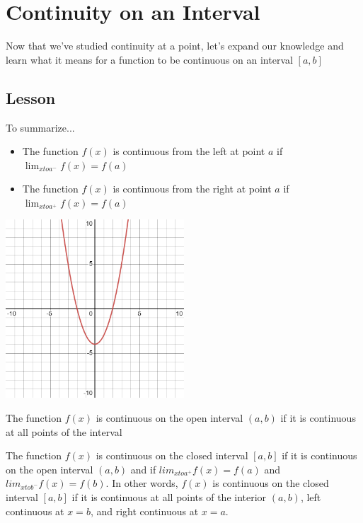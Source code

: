 \documentclass{ximera}
\begin{document}
\section{Continuity on an Interval}

Now that we've studied continuity at a point, let's expand our knowledge and learn what it means for a function to be continuous on an interval $[a,b]$

\subsection{Lesson}
\begin{center}
\end{center}

To summarize...

\begin{explanation}
    \begin{foldable}
        \begin{itemize}
            \item The function $f(x)$ is continuous from the left at point $a$ if $\lim_{x to a^-} f(x) = f(a)$
            \item The function $f(x)$ is continuous from the right at point $a$ if $\lim_{x to a^+} f(x) = f(a)$
        \end{itemize}
        \begin{center}            
        \includegraphics[width=0.5\textwidth]{graph4.png}
        \end{center}
    \end{foldable}

    \begin{foldable}
        The function $f(x)$ is continuous on the open interval $(a,b)$ if it is continuous at all points of the interval
    \end{foldable}

    \begin{foldable}
        The function $f(x)$ is continuous on the closed interval $[a,b]$ if it is continuous on the open interval $(a,b)$ and if $lim_{x to a^+} f(x) = f(a)$ and $lim_{x to b^-} f(x) = f(b)$.
        In other words, $f(x)$ is continuous on the closed interval $[a,b]$ if it is continuous at all points of the interior $(a,b)$, left continuous at $x=b$, and right continuous at $x=a$.
    \end{foldable}{}
\end{explanation}
\end{document}
